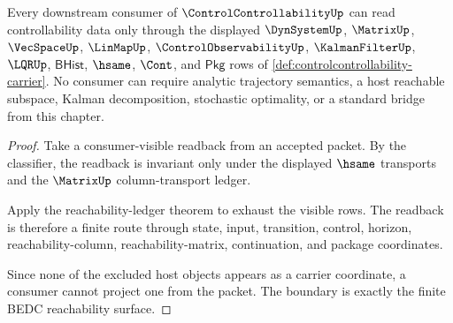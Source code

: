 \begin{theorem}
\label{thm:controlcontrollability-consumer-boundary}
Every downstream consumer of $\ControlControllabilityUp$ can read controllability data only through the displayed $\DynSystemUp$, $\MatrixUp$, $\VecSpaceUp$, $\LinMapUp$, $\ControlObservabilityUp$, $\KalmanFilterUp$, $\LQRUp$, $\mathsf{BHist}$, $\hsame$, $\Cont$, and $\mathsf{Pkg}$ rows of \autoref{def:controlcontrollability-carrier}. No consumer can require analytic trajectory semantics, a host reachable subspace, Kalman decomposition, stochastic optimality, or a standard bridge from this chapter.
\end{theorem}
\begin{proof}
Take a consumer-visible readback from an accepted packet. By the classifier, the readback is invariant only under the displayed $\hsame$ transports and the $\MatrixUp$ column-transport ledger.

Apply the reachability-ledger theorem to exhaust the visible rows. The readback is therefore a finite route through state, input, transition, control, horizon, reachability-column, reachability-matrix, continuation, and package coordinates.

Since none of the excluded host objects appears as a carrier coordinate, a consumer cannot project one from the packet. The boundary is exactly the finite BEDC reachability surface.
\end{proof}

